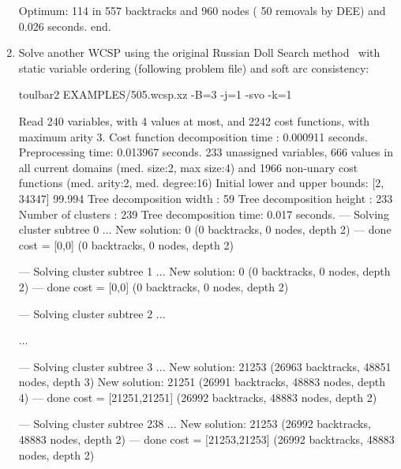 \begin{enumerate}
{\begin{DoxyCode}
Optimum: 114 in 557 backtracks and 960 nodes ( 50 removals by DEE) and 0.026 seconds.
end.
\end{DoxyCode}}
\item Solve another WCSP using the original Russian Doll Search method~\cite{Verfaillie96} with static variable
ordering (following problem file) and soft arc consistency:
\begin{DoxyCode}
	toulbar2 EXAMPLES/505.wcsp.xz -B=3 -j=1 -svo -k=1
\end{DoxyCode}
{\scriptsize
\begin{DoxyCode}
Read 240 variables, with 4 values at most, and 2242 cost functions, with maximum arity 3.
Cost function decomposition time : 0.000911 seconds.
Preprocessing time: 0.013967 seconds.
233 unassigned variables, 666 values in all current domains (med. size:2, max size:4) and 1966 non-unary cost functions (med. arity:2, med. degree:16)
Initial lower and upper bounds: [2, 34347] 99.994%
Tree decomposition width  : 59
Tree decomposition height : 233
Number of clusters        : 239
Tree decomposition time: 0.017 seconds.
--- Solving cluster subtree 0 ...
New solution: 0 (0 backtracks, 0 nodes, depth 2)
---  done  cost = [0,0] (0 backtracks, 0 nodes, depth 2)

--- Solving cluster subtree 1 ...
New solution: 0 (0 backtracks, 0 nodes, depth 2)
---  done  cost = [0,0] (0 backtracks, 0 nodes, depth 2)

--- Solving cluster subtree 2 ...

...

--- Solving cluster subtree 3 ...
New solution: 21253 (26963 backtracks, 48851 nodes, depth 3)
New solution: 21251 (26991 backtracks, 48883 nodes, depth 4)
---  done  cost = [21251,21251] (26992 backtracks, 48883 nodes, depth 2)

--- Solving cluster subtree 238 ...
New solution: 21253 (26992 backtracks, 48883 nodes, depth 2)
---  done  cost = [21253,21253] (26992 backtracks, 48883 nodes, depth 2)


\end{DoxyCode}}
\end{enumerate}
